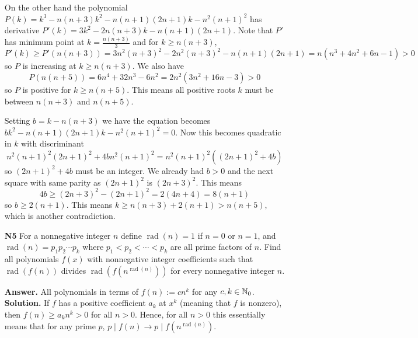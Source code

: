 \documentclass[11pt,a4paper]{article}
\begin{document}
\begin{enumerate}
	On the other hand the polynomial $P(k)=k^3-n(n+3)k^2-n(n+1)(2n+1)k-n^2(n+1)^2$ has derivative $P'(k)=3k^2-2n(n+3)k-n(n+1)(2n+1)$. Note that $P'$ has minimum point at $k=\frac{n(n+3)}{3}$ and for $k\ge n(n+3)$, 
	\[
	P'(k)\ge P'(n(n+3))=3n^2(n+3)^2-2n^2(n+3)^2-n(n+1)(2n+1)=n(n^3 +4n^2 +6n-1) > 0
	\]
	so $P$ is increasing at $k\ge n(n+3)$. We also have 
	\[
	P(n(n+5)) = 6n^4+32n^3-6n^2 =2n^2(3n^2+16n-3)>0
	\]
	so $P$ is positive for $k\ge n(n+5)$. This means all positive roots $k$ must be between $n(n+3)$ and $n(n+5)$. 
	
	Setting $b=k-n(n+3)$ we have the equation becomes $bk^2-n(n+1)(2n+1)k-n^2(n+1)^2=0$. 
	Now this becomes quadratic in $k$ with discriminant 
	\[
	n^2(n+1)^2(2n+1)^2 +4bn^2(n+1)^2 = n^2(n+1)^2 ((2n+1)^2+4b)
	\]
	so $(2n+1)^2+4b$ must be an integer. We already had $b>0$ and the next square with same parity as $(2n+1)^2$ is $(2n+3)^2$. This means 
	\[
	4b\ge (2n+3)^2-(2n+1)^2 = 2(4n+4)=8(n+1)
	\]
	so $b\ge 2(n+1)$. This means $k\ge n(n+3)+2(n+1)>n(n+5)$, which is another contradiction. 
	
	\item[\textbf{N5}] For a nonnegative integer $n$ define $\operatorname{rad}(n)=1$ if $n=0$ or $n=1$, and $\operatorname{rad}(n)=p_1p_2\cdots p_k$ where $p_1<p_2<\cdots <p_k$ are all prime factors of $n$. Find all polynomials $f(x)$ with nonnegative integer coefficients such that $\operatorname{rad}(f(n))$ divides $\operatorname{rad}(f(n^{\operatorname{rad}(n)}))$ for every nonnegative integer $n$.
	
	\textbf{Answer.} All polynomials in terms of $f(n):=cn^k$ for any $c, k\in\mathbb{N}_0$. \\
	\textbf{Solution.} If $f$ has a positive coefficient $a_k$ at $x^k$ (meaning that $f$ is nonzero), then $f(n)\ge a_kn^k>0$ for all $n>0$. Hence, for all $n>0$ this essentially means that for any prime $p$, $p\mid f(n)\to p\mid f(n^{\operatorname{rad}(n)})$. 
	

\end{enumerate}
\end{document}
